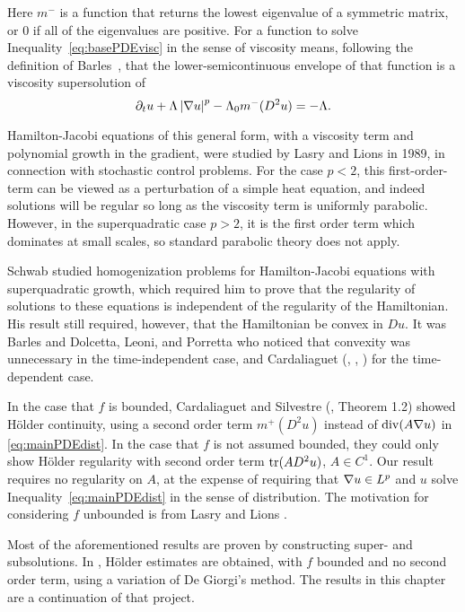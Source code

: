 Here $m^-$ is a function that returns the lowest eigenvalue of a symmetric matrix, or 0 if all of the eigenvalues are positive.  For a function to solve Inequality~\eqref{eq:basePDEvisc} in the sense of viscosity means, following the definition of Barles~\cite{Ba.viscosity}, that the lower-semicontinuous envelope of that function is a viscosity supersolution of 
\[ \partial_t u + \Lambda \left\lvert \nabla u \right\rvert^p - \Lambda_0 m^-(D^2 u) = -\Lambda. \]

Hamilton-Jacobi equations of this general form, with a viscosity term and polynomial growth in the gradient, were studied by Lasry and Lions \cite{LaLi.nonlinear} in 1989, in connection with stochastic control problems.  For the case $p < 2$, this first-order-term can be viewed as a perturbation of a simple heat equation, and indeed solutions will be regular so long as the viscosity term is uniformly parabolic.  However, in the superquadratic case $p > 2$, it is the first order term which dominates at small scales, so standard parabolic theory does not apply.  

Schwab \cite{Sc.hamjac} studied homogenization problems for Hamilton-Jacobi equations with superquadratic growth, which required him to prove that the regularity of solutions to these equations is independent of the regularity of the Hamiltonian.  His result still required, however, that the Hamiltonian be convex in $Du$.  It was Barles \cite{Ba.hamjac} and Dolcetta, Leoni, and Porretta \cite{DoLePo} who noticed that convexity was unnecessary in the time-independent case, and Cardaliaguet (\cite{Ca}, \cite{CaCa}, \cite{CaSi.hamjac}) for the time-dependent case.  

In the case that $f$ is bounded, Cardaliaguet and Silvestre (\cite{CaSi.hamjac}, Theorem 1.2) showed H\"{o}lder continuity, using a second order term $m^+(D^2 u)$ instead of $\operatorname{div}(A \nabla u)$ in \eqref{eq:mainPDEdist}.  In the case that $f$ is not assumed bounded, they could only show H\"{o}lder regularity with second order term $\operatorname{tr}(A D^2 u)$, $A \in C^1$.  Our result requires no regularity on $A$, at the expense of requiring that $\nabla u \in L^p$ and $u$ solve Inequality~\eqref{eq:mainPDEdist} in the sense of distribution.  The motivation for considering $f$ unbounded is from Lasry and Lions \cite{LaLi.meanfield}.  

Most of the aforementioned results are proven by constructing super- and subsolutions.  In \cite{ChVa}, H\"{o}lder estimates are obtained, with $f$ bounded and no second order term, using a variation of De Giorgi's method.  The results in this chapter are a continuation of that project.  

